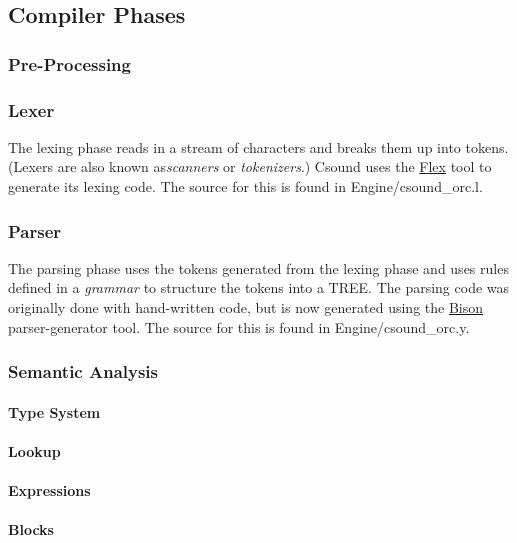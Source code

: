 \subsection{Compiler Phases}

\subsubsection{Pre-Processing}

\subsubsection{Lexer}

The lexing phase reads in a stream of characters and breaks them up into
tokens. (Lexers are also known as\emph{scanners} or \emph{tokenizers}.)
Csound uses the \href{http://flex.sourceforge.net/}{Flex} tool to
generate its lexing code. The source for this is found in
Engine/csound\_orc.l.

\subsubsection{Parser}

The parsing phase uses the tokens generated from the lexing phase and
uses rules defined in a \emph{grammar} to structure the tokens into a
TREE. The parsing code was originally done with hand-written code, but
is now generated using the
\href{http://www.gnu.org/software/bison/}{Bison} parser-generator tool.
The source for this is found in Engine/csound\_orc.y.

\subsubsection{Semantic Analysis}

\paragraph{Type System}

\paragraph{Lookup}

\paragraph{Expressions}

\paragraph{Blocks}

